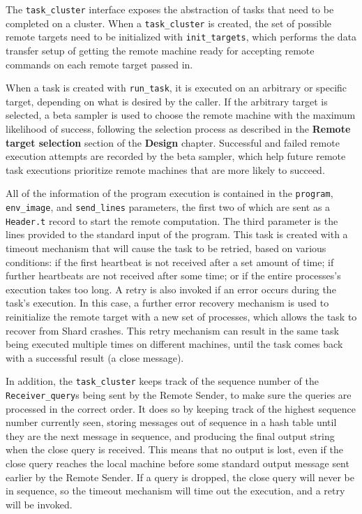 \documentclass[twoside]{report}
\begin{document}
The \texttt{task\_cluster} interface exposes the abstraction of tasks that need to be completed on a cluster.
When a \texttt{task\_cluster} is created, the set of possible remote targets need to be initialized with \texttt{init\_targets}, which performs the data transfer setup of getting the remote machine ready for accepting remote commands on each remote target passed in.

When a task is created with \texttt{run\_task}, it is executed on an arbitrary or specific target, depending on what is desired by the caller.
If the arbitrary target is selected, a beta sampler is used to choose the remote machine with the maximum likelihood of success, following the selection process as described in the \textbf{Remote target selection} section of the \textbf{Design} chapter.
Successful and failed remote execution attempts are recorded by the beta sampler, which help future remote task executions prioritize remote machines that are more likely to succeed.

All of the information of the program execution is contained in the \texttt{program}, \texttt{env\_image}, and \texttt{send\_lines} parameters, the first two of which are sent as a \texttt{Header.t} record to start the remote computation. The third parameter is the lines provided to the standard input of the program.
This task is created with a timeout mechanism that will cause the task to be retried, based on various conditions: if the first heartbeat is not received after a set amount of time; if further heartbeats are not received after some time; or if the entire processes's execution takes too long.
A retry is also invoked if an error occurs during the task's execution.
In this case, a further error recovery mechanism is used to reinitialize the remote target with a new set of processes, which allows the task to recover from Shard crashes.
This retry mechanism can result in the same task being executed multiple times on different machines, until the task comes back with a successful result (a close message).

In addition, the \texttt{task\_cluster} keeps track of the sequence number of the \texttt{Receiver\_query}s being sent by the Remote Sender, to make sure the queries are processed in the correct order.
It does so by keeping track of the highest sequence number currently seen, storing messages out of sequence in a hash table until they are the next message in sequence, and producing the final output string when the close query is received.
This means that no output is lost, even if the close query reaches the local machine before some standard output message sent earlier by the Remote Sender.
If a query is dropped, the close query will never be in sequence, so the timeout mechanism will time out the execution, and a retry will be invoked.
\end{document}
